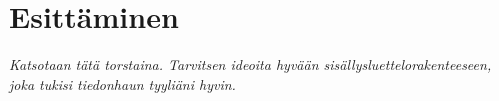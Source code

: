 \documentclass[12pt,a4paper,finnish,oneside]{article}
\begin{document}
\section{Esittäminen}

\emph{Katsotaan tätä torstaina. Tarvitsen ideoita hyvään sisällysluettelorakenteeseen, joka tukisi tiedonhaun tyyliäni hyvin.}

%


% 

\renewcommand{\refname}{Lähteet}  %



\end{document}
